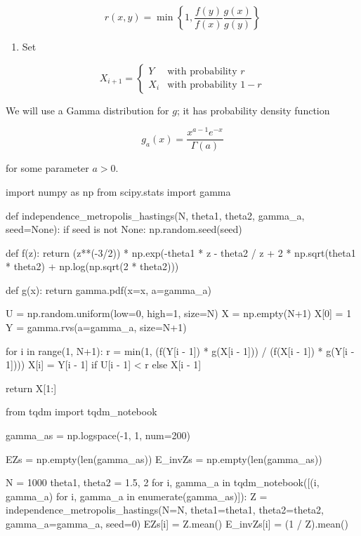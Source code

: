 \[ r(x, y) = \min \left\{ 1, \frac{f(y)}{f(x)} \frac{g(x)}{g(y)} \right\} \]

\begin{enumerate}[tightlist,label={\arabic*.},resume]
\item
  Set
\end{enumerate}

\[
X_{i+1} = \begin{cases}
Y   &\text{with probability } r \\
X_{i} &\text{with probability } 1 - r 
\end{cases}
\]

We will use a Gamma distribution for \(g\); it has probability density
function

\[ g_a(x) = \frac{x^{a - 1} e^{-x}}{\Gamma(a)} \]

for some parameter \(a > 0\).

\begin{python}
import numpy as np
from scipy.stats import gamma

def independence_metropolis_hastings(N, theta1, theta2, gamma_a, seed=None):
    if seed is not None:
        np.random.seed(seed)
            
    def f(z):
        return (z**(-3/2)) * np.exp(-theta1 * z - theta2 / z + 2 * np.sqrt(theta1 * theta2) + np.log(np.sqrt(2 * theta2)))
        
    def g(x):
        return gamma.pdf(x=x, a=gamma_a)
    
    U = np.random.uniform(low=0, high=1, size=N)
    X = np.empty(N+1)
    X[0] = 1
    Y = gamma.rvs(a=gamma_a, size=N+1)
    
    for i in range(1, N+1):
        r = min(1, (f(Y[i - 1]) * g(X[i - 1])) / (f(X[i - 1]) * g(Y[i - 1])))
        X[i] = Y[i - 1] if U[i - 1] < r else X[i - 1]
        
    return X[1:]
\end{python}

\begin{python}
from tqdm import tqdm_{n}otebook

gamma_as = np.logspace(-1, 1, num=200)

EZs = np.empty(len(gamma_as))
E_{i}nvZs = np.empty(len(gamma_as))

N = 1000
theta1, theta2 = 1.5, 2
for i, gamma_a in tqdm_{n}otebook([(i, gamma_a) for i, gamma_a in enumerate(gamma_as)]):
    Z = independence_metropolis_hastings(N=N, theta1=theta1, theta2=theta2, gamma_a=gamma_a, seed=0)
    EZs[i] = Z.mean()
    E_{i}nvZs[i] = (1 / Z).mean()
\end{python}


